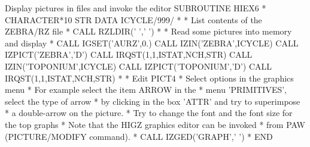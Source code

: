 \newpage

\begin{XMPt}{Display pictures in \HIGZ{} files and invoke the \HIGZ{} editor}
      SUBROUTINE HIEX6
*
      CHARACTER*10 STR
      DATA ICYCLE/999/
*
*           List contents of the ZEBRA/RZ file
*
      CALL RZLDIR(' ',' ')
*
*           Read some pictures into memory and display
*
      CALL IGSET('AURZ',0.)
      CALL IZIN('ZEBRA',ICYCLE)
      CALL IZPICT('ZEBRA','D')
      CALL IRQST(1,1,ISTAT,NCH,STR)
      CALL IZIN('TOPONIUM',ICYCLE)
      CALL IZPICT('TOPONIUM','D')
      CALL IRQST(1,1,ISTAT,NCH,STR)
*
*           Edit PICT4
*           Select options in the graphics menu
*           For example select the item ARROW in the
*           menu 'PRIMITIVES', select the type of arrow
*           by clicking in the box 'ATTR' and try to superimpose
*           a double-arrow on the picture.
*           Try to change the font and the font size for the top graphs
*           Note that the HIGZ graphics editor can be invoked
*           from PAW (PICTURE/MODIFY command).
*
      CALL IZGED('GRAPH',' ')
*
      END
\end{XMPt}
